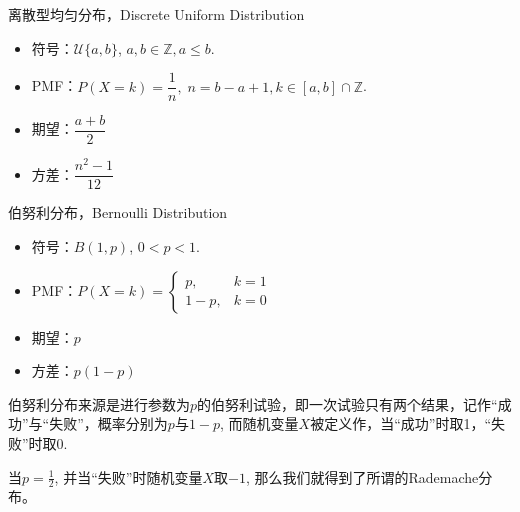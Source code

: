 \begin{frame}

\begin{block}{离散型均匀分布，Discrete Uniform Distribution}
\begin{itemize}
\item 符号：$\mathcal{U}\{a,b\}$, \; $a,b\in\mathbb{Z}, a \le b$.
\item PMF：$P(X = k) = \dfrac{1}{n}, \; n = b-a+1, k\in [a,b]\cap\mathbb{Z}$.
\item 期望：$\dfrac{a+b}{2}$
\item 方差：$\dfrac{n^2-1}{12}$
\end{itemize}
\end{block}

\end{frame}


\begin{frame}

\begin{block}{伯努利分布，Bernoulli Distribution}
\begin{itemize}
\item 符号：$B(1,p)$, \; $0<p<1$.
\item PMF：$P(X = k) = \begin{cases}
p, & k=1\\
1-p, & k=0
\end{cases}$
\item 期望：$p$
\item 方差：$p(1-p)$
\end{itemize}

伯努利分布来源是进行参数为$p$的伯努利试验，即一次试验只有两个结果，记作``成功''与``失败''，概率分别为$p$与$1-p$, 而随机变量$X$被定义作，当``成功''时取1，``失败''时取0.
\end{block}

\vspace{1em}
\pause

当$p=\frac{1}{2}$, 并当``失败''时随机变量$X$取$-1$, 那么我们就得到了所谓的Rademache分布。

\end{frame}


